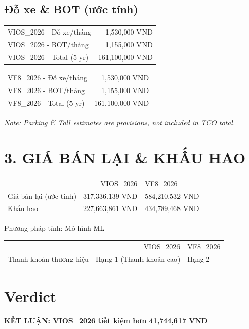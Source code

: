 \documentclass[11pt,a4paper]{article}
\begin{document}
\vspace{0.3cm}\subsection*{Đỗ xe \& BOT (ước tính)}
\begin{tabular}{l r}
\toprule
VIOS\_2026 - Đỗ xe/tháng & 1,530,000 VND \\
VIOS\_2026 - BOT/tháng & 1,155,000 VND \\
VIOS\_2026 - Total (5 yr) & 161,100,000 VND \\
\bottomrule
\end{tabular}
\vspace{0.3cm}\begin{tabular}{l r}
\toprule
VF8\_2026 - Đỗ xe/tháng & 1,530,000 VND \\
VF8\_2026 - BOT/tháng & 1,155,000 VND \\
VF8\_2026 - Total (5 yr) & 161,100,000 VND \\
\bottomrule
\end{tabular}
\vspace{0.3cm}\textit{Note: Parking \& Toll estimates are provisions, not included in TCO total.}

\section*{3. GIÁ BÁN LẠI \& KHẤU HAO}
\begin{tabular}{l r}
\toprule
 & VIOS\_2026 & VF8\_2026 \\
Giá bán lại (ước tính) & 317,336,139 VND & 584,210,532 VND \\
Khấu hao & 227,663,861 VND & 434,789,468 VND \\
\bottomrule
\end{tabular}
\vspace{0.3cm}Phương pháp tính: Mô hình ML

\begin{tabular}{l r}
\toprule
 & VIOS\_2026 & VF8\_2026 \\
Thanh khoản thương hiệu & Hạng 1 (Thanh khoản cao) & Hạng 2 \\
\bottomrule
\end{tabular}
\vspace{0.3cm}\section*{Verdict}
\textbf{\color{WinnerGreen} KẾT LUẬN: VIOS\_2026 tiết kiệm hơn 41,744,617 VND}\\
\end{document}
